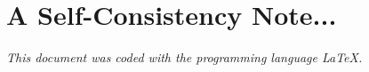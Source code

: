 \chapter*{A Self-Consistency Note...} %

\label{Note} %

\emph{This document was coded with the programming language \LaTeX.}